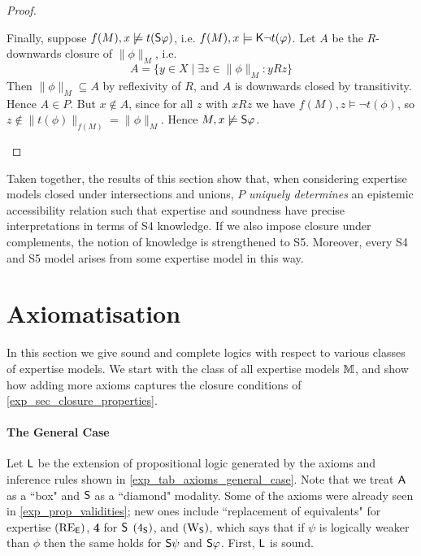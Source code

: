 \begin{proof}
\begin{itemize}
              Finally, suppose $f(M), x \not\models t(\S\phi)$, i.e.  $f(M), x
              \models \K\neg t(\phi)$. Let $A$ be the $R$-downwards closure of
              $\|\phi\|_M$, i.e.
              \[
                  A = \{y \in X \mid \exists z \in \|\phi\|_M: yRz\}
              \]
              Then $\|\phi\|_M \subseteq A$ by reflexivity of $R$, and $A$ is
              downwards closed by transitivity.  Hence $A \in P$.  But $x
              \notin A$, since for all $z$ with $xRz$ we have $f(M), z \models
              \neg t(\phi)$, so $z \notin \|t(\phi)\|_{f(M)} = \|\phi\|_M$.
              Hence $M, x \not\models \S\phi$.
    \end{itemize}
\end{proof}

Taken together, the results of this section show that, when considering
expertise models closed under intersections and unions, $P$ \emph{uniquely determines}
an epistemic accessibility relation such that expertise and soundness have
precise interpretations in terms of S4 knowledge. If we also impose closure
under complements, the notion of knowledge is strengthened to S5. Moreover,
every S4 and S5 model arises from some expertise model in this way.

\section{Axiomatisation}
\label{exp_sec_axiomatisation}

In this section we give sound and complete logics with respect to various
classes of expertise models. We start with the class of all expertise
models $\M$, and show how adding more axioms captures the closure conditions of
\cref{exp_sec_closure_properties}.

\paragraph{The General Case}

Let $\sL$ be the extension of propositional logic generated by the axioms and
inference rules shown in \cref{exp_tab_axioms_general_case}. Note that we treat
$\A$ as a ``box" and $\S$ as a ``diamond" modality. Some of the axioms were
already seen in \cref{exp_prop_validities}; new ones include ``replacement of
equivalents" for expertise $\reE$, \textbf{4} for $\S$ $\foursoundness$,
and $\weakeningS$, which says that if $\psi$ is logically weaker than $\phi$
then the same holds for $\S\psi$ and $\S\phi$. First, $\sL$ is sound.

